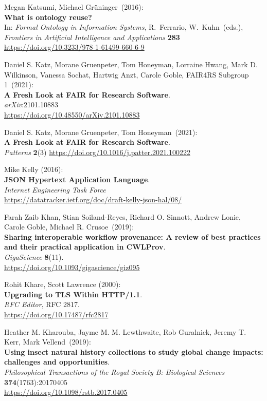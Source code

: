 \begin{thebibliography}{9}
Megan Katsumi, Michael Grüninger~(2016):\\
\textbf{What is ontology reuse?}\\
In: \emph{Formal Ontology in Information Systems}, R.~Ferrario, 
W.~Kuhn~(eds.),\\
\emph{Frontiers in Artificial Intelligence and Applications}
\textbf{283}\\
\url{https://doi.org/10.3233/978-1-61499-660-6-9}

Daniel S. Katz, Morane Gruenpeter, Tom Honeyman, Lorraine Hwang,
Mark D. Wilkinson, Vanessa Sochat, Hartwig Anzt, Carole Goble, FAIR4RS
Subgroup 1~(2021):\\
\textbf{A Fresh Look at FAIR for Research Software}.\\
\emph{arXiv}:2101.10883\\
\url{https://doi.org/10.48550/arXiv.2101.10883}

Daniel S. Katz, Morane Gruenpeter, Tom Honeyman~(2021):\\
\textbf{A Fresh Look at FAIR for Research Software}.\\
\emph{Patterns} \textbf{2}(3)
\url{https://doi.org/10.1016/j.patter.2021.100222}

Mike Kelly (2016): \\
\textbf{JSON Hypertext Application Language}.\\
\emph{Internet Engineering Task Force}\\
\url{https://datatracker.ietf.org/doc/draft-kelly-json-hal/08/}

Farah Zaib Khan, Stian Soiland-Reyes, Richard O. Sinnott,
Andrew Lonie, Carole Goble, Michael R. Crusoe~(2019):\\
\textbf{Sharing interoperable workflow provenance: A review of best
practices and their practical application in CWLProv}.\\
\emph{GigaScience} \textbf{8}(11).\\
\url{https://doi.org/10.1093/gigascience/giz095}

Rohit Khare, Scott Lawrence (2000): \\
\textbf{Upgrading to {TLS Within HTTP}/1.1}.\\
\emph{RFC Editor}, RFC 2817. \\
\url{https://doi.org/10.17487/rfc2817}

Heather M. Kharouba, Jayme M. M. Lewthwaite, Rob Guralnick, Jeremy T. Kerr, Mark Vellend~(2019):\\
\textbf{Using insect natural history collections to study global change impacts: challenges and opportunities}.\\
\emph{Philosophical Transactions of the Royal Society B: Biological Sciences}
\textbf{374}(1763):20170405\\
\url{https://doi.org/10.1098/rstb.2017.0405}


\end{thebibliography}
